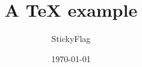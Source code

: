 \documentclass[10pt]{article}
\begin{document}
  \title{A TeX example}
  \author{StickyFlag}
  \date{\today}
  \maketitle
\end{document}

